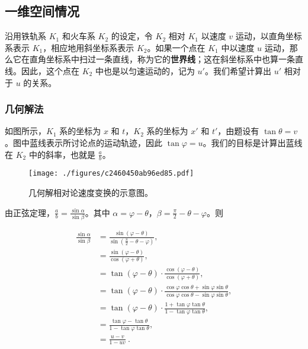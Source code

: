 
\subsection{一维空间情况}

沿用铁轨系 $K_1$ 和火车系 $K_2$ 的设定，令 $K_2$ 相对 $K_1$ 以速度 $v$ 运动，以直角坐标系表示 $K_1$，相应地用斜坐标系表示 $K_2$。如果一个点在 $K_1$ 中以速度 $u$ 运动，那么它在直角坐标系中扫过一条直线，称为它的\textbf{世界线}；这在斜坐标系中也算一条直线。因此，这个点在 $K_2$ 中也是以匀速运动的，记为 $u'$。我们希望计算出 $u'$ 相对于 $u$ 的关系。


\subsubsection{几何解法}

如图所示，$K_1$ 系的坐标为 $x$ 和 $t$，$K_2$ 系的坐标为 $x'$ 和 $t'$，由题设有 $\tan{\theta}=v$。图中蓝线表示所讨论点的运动轨迹，因此 $\tan{\varphi}=u$。我们的目标是计算出蓝线在 $K_2$ 中的斜率，也就是 $\frac{a}{b}$。


\begin{figure}[ht]
\centering
\texttt{[image: ./figures/c2460450ab96ed85.pdf]}
\caption{几何解相对论速度变换的示意图。} \label{fig_RelVel_1}
\end{figure}

由正弦定理，$\frac{a}{b}=\frac{\sin{\alpha}}{\sin{\beta}}$。其中 $\alpha=\varphi-\theta$，$\beta=\frac{\pi}{2}-\theta-\varphi$。则

\begin{equation}\label{eq_RelVel_1}
\begin{aligned}
\frac{\sin{\alpha}}{\sin{\beta}}&=\frac{\sin{(\varphi-\theta)}}{\sin{(\frac{\pi}{2}-\theta-\varphi)}},\\ 
&=\frac{\sin{(\varphi-\theta)}}{\cos{(\varphi+\theta)}},\\ 
&=\tan(\varphi-\theta)\cdot\frac{\cos(\varphi-\theta)}{\cos(\varphi+\theta)},\\ 
&=\tan(\varphi-\theta)\cdot\frac{\cos\varphi\cos\theta+\sin\varphi\sin\theta}{\cos\varphi\cos\theta-\sin\varphi\sin\theta},\\ 
&=\tan(\varphi-\theta)\cdot\frac{1+\tan\varphi\tan\theta}{1-\tan\varphi\tan\theta},\\ 
&=\frac{\tan\varphi-\tan\theta}{1-\tan\varphi\tan\theta},\\ 
&=\frac{u-v}{1-uv}~.
\end{aligned}
\end{equation}

